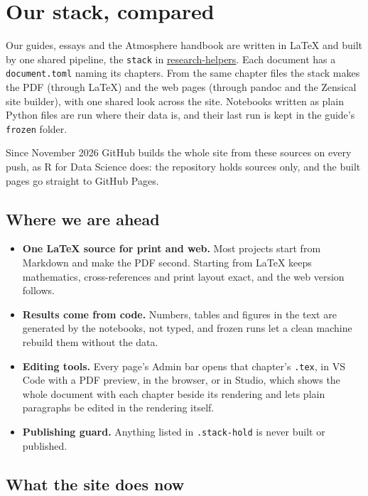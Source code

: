 \chapter{Our stack, compared}

Our guides, essays and the Atmosphere handbook are written in LaTeX and built by one shared pipeline, the \texttt{stack} in \href{https://github.com/GeospatialGeeks/research-helpers}{research-helpers}. Each document has a \texttt{document.toml} naming its chapters. From the same chapter files the stack makes the PDF (through LaTeX) and the web pages (through pandoc and the Zensical site builder), with one shared look across the site. Notebooks written as plain Python files are run where their data is, and their last run is kept in the guide's \texttt{frozen} folder.

Since November 2026 GitHub builds the whole site from these sources on every push, as R for Data Science does: the repository holds sources only, and the built pages go straight to GitHub Pages.

\section{Where we are ahead}

\begin{itemize}
\item \textbf{One LaTeX source for print and web.} Most projects start from Markdown and make the PDF second. Starting from LaTeX keeps mathematics, cross-references and print layout exact, and the web version follows.
\item \textbf{Results come from code.} Numbers, tables and figures in the text are generated by the notebooks, not typed, and frozen runs let a clean machine rebuild them without the data.
\item \textbf{Editing tools.} Every page's Admin bar opens that chapter's \texttt{.tex}, in VS Code with a PDF preview, in the browser, or in Studio, which shows the whole document with each chapter beside its rendering and lets plain paragraphs be edited in the rendering itself.
\item \textbf{Publishing guard.} Anything listed in \texttt{.stack-hold} is never built or published.
\end{itemize}

\section{What the site does now}

